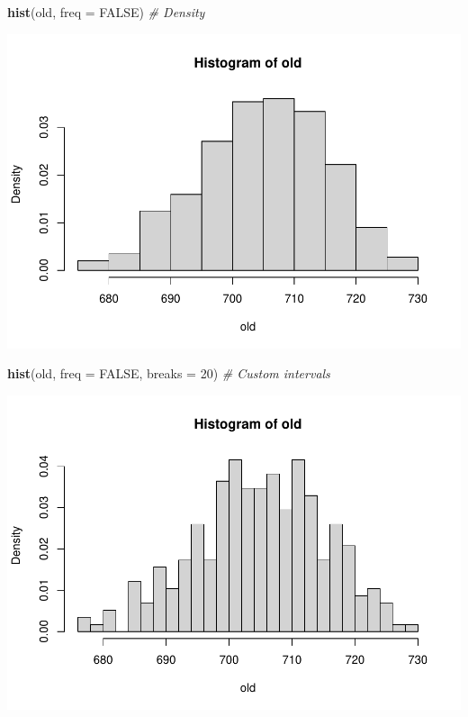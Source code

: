 \documentclass[
]{article}
\newenvironment{Shaded}{\begin{snugshade}}{\end{snugshade}}
\newcommand{\AttributeTok}[1]{\textcolor[rgb]{0.13,0.29,0.53}{#1}}
\newcommand{\CommentTok}[1]{\textcolor[rgb]{0.56,0.35,0.01}{\textit{#1}}}
\newcommand{\ConstantTok}[1]{\textcolor[rgb]{0.56,0.35,0.01}{#1}}
\newcommand{\DecValTok}[1]{\textcolor[rgb]{0.00,0.00,0.81}{#1}}
\newcommand{\FunctionTok}[1]{\textcolor[rgb]{0.13,0.29,0.53}{\textbf{#1}}}
\newcommand{\NormalTok}[1]{#1}
\begin{document}
\begin{Shaded}
\begin{Highlighting}[]
\FunctionTok{hist}\NormalTok{(old, }\AttributeTok{freq =} \ConstantTok{FALSE}\NormalTok{)  }\CommentTok{\# Density}
\end{Highlighting}
\end{Shaded}

\includegraphics{EDA_files/figure-latex/unnamed-chunk-16-2.pdf}

\begin{Shaded}
\begin{Highlighting}[]
\FunctionTok{hist}\NormalTok{(old, }\AttributeTok{freq =} \ConstantTok{FALSE}\NormalTok{, }\AttributeTok{breaks =} \DecValTok{20}\NormalTok{)  }\CommentTok{\# Custom intervals}
\end{Highlighting}
\end{Shaded}

\includegraphics{EDA_files/figure-latex/unnamed-chunk-16-3.pdf}
\end{document}
